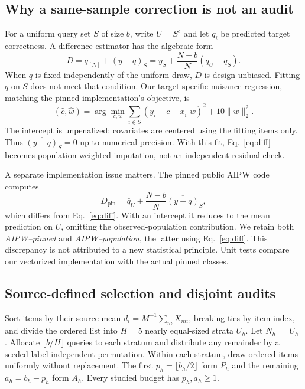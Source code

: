 \documentclass{article}
\begin{document}
\subsection{Why a same-sample correction is not an audit}
For a uniform query set $S$ of size $b$, write $U=S^c$ and let $q_i$ be predicted target correctness. A difference estimator has the algebraic form
\begin{equation}\label{eq:diff}
D=\bar q_{[N]}+\overline{(y-q)}_S
 =\bar y_S+\frac{N-b}{N}(\bar q_U-\bar q_S).
\end{equation}
When $q$ is fixed independently of the uniform draw, $D$ is design-unbiased. Fitting $q$ on $S$ does not meet that condition. Our target-specific nuisance regression, matching the pinned implementation's objective, is
\begin{equation}\label{eq:ridge}
(\hat c,\hat w)=\arg\min_{c,w}\sum_{i\in S}(y_i-c-x_i^\top w)^2+10\|w\|_2^2.
\end{equation}
The intercept is unpenalized; covariates are centered using the fitting items only. Thus $\overline{(y-q)}_S=0$ up to numerical precision. With this fit, Eq.~\eqref{eq:diff} becomes population-weighted imputation, not an independent residual check.

A separate implementation issue matters. The pinned public AIPW code computes
\begin{equation}\label{eq:pinned}
D_{\mathrm{pin}}=\bar q_U+\frac{N-b}{N}\overline{(y-q)}_S,
\end{equation}
which differs from Eq.~\eqref{eq:diff}. With an intercept it reduces to the mean prediction on $U$, omitting the observed-population contribution. We retain both \emph{AIPW--pinned} and \emph{AIPW--population}, the latter using Eq.~\eqref{eq:diff}. This discrepancy is not attributed to a new statistical principle. Unit tests compare our vectorized implementation with the actual pinned classes.

\subsection{Source-defined selection and disjoint audits}
Sort items by their source mean $d_i=M^{-1}\sum_m X_{mi}$, breaking ties by item index, and divide the ordered list into $H=5$ nearly equal-sized strata $U_h$. Let $N_h=|U_h|$. Allocate $\lfloor b/H\rfloor$ queries to each stratum and distribute any remainder by a seeded label-independent permutation. Within each stratum, draw ordered items uniformly without replacement. The first $p_h=\lfloor b_h/2\rfloor$ form $P_h$ and the remaining $a_h=b_h-p_h$ form $A_h$. Every studied budget has $p_h,a_h\geq1$.
\end{document}
